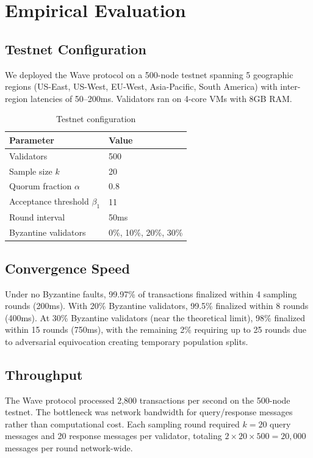 \section{Empirical Evaluation}

\label{sec:evaluation}

\subsection{Testnet Configuration}

We deployed the Wave protocol on a 500-node testnet spanning 5 geographic regions
(US-East, US-West, EU-West, Asia-Pacific, South America) with inter-region latencies
of 50--200ms. Validators ran on 4-core VMs with 8GB RAM.

\begin{table}[h]
\centering
\begin{tabular}{@{}ll@{}}
\toprule
\textbf{Parameter} & \textbf{Value} \\
\midrule
Validators & 500 \\
Sample size $k$ & 20 \\
Quorum fraction $\alpha$ & 0.8 \\
Acceptance threshold $\beta_1$ & 11 \\
Round interval & 50ms \\
Byzantine validators & 0\%, 10\%, 20\%, 30\% \\
\bottomrule
\end{tabular}
\caption{Testnet configuration}
\label{tab:testnet}
\end{table}

\subsection{Convergence Speed}

Under no Byzantine faults, 99.97\% of transactions finalized within 4 sampling rounds
(200ms). With 20\% Byzantine validators, 99.5\% finalized within 8 rounds (400ms).
At 30\% Byzantine validators (near the theoretical limit), 98\% finalized within 15
rounds (750ms), with the remaining 2\% requiring up to 25 rounds due to adversarial
equivocation creating temporary population splits.

\subsection{Throughput}

The Wave protocol processed 2,800 transactions per second on the 500-node testnet.
The bottleneck was network bandwidth for query/response messages rather than computational
cost. Each sampling round required $k = 20$ query messages and 20 response messages per
validator, totaling $2 \times 20 \times 500 = 20{,}000$ messages per round network-wide.

